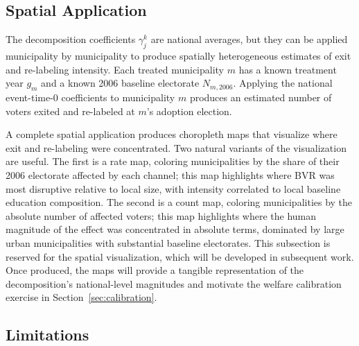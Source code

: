 \subsection{Spatial Application}
\label{ssec:decomposition_spatial}

The decomposition coefficients $\gamma_j^k$ are national averages, but they can be applied municipality by municipality to produce spatially heterogeneous estimates of exit and re-labeling intensity. Each treated municipality $m$ has a known treatment year $g_m$ and a known 2006 baseline electorate $N_{m,2006}$. Applying the national event-time-$0$ coefficients to municipality $m$ produces an estimated number of voters exited and re-labeled at $m$'s adoption election.

A complete spatial application produces choropleth maps that visualize where exit and re-labeling were concentrated. Two natural variants of the visualization are useful. The first is a rate map, coloring municipalities by the share of their 2006 electorate affected by each channel; this map highlights where BVR was most disruptive relative to local size, with intensity correlated to local baseline education composition. The second is a count map, coloring municipalities by the absolute number of affected voters; this map highlights where the human magnitude of the effect was concentrated in absolute terms, dominated by large urban municipalities with substantial baseline electorates. This subsection is reserved for the spatial visualization, which will be developed in subsequent work. Once produced, the maps will provide a tangible representation of the decomposition's national-level magnitudes and motivate the welfare calibration exercise in Section~\ref{sec:calibration}.

\subsection{Limitations}
\label{ssec:decomposition_limitations}

